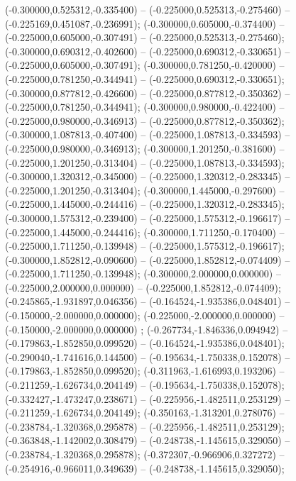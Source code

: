  (-0.300000,0.525312,-0.335400) -- (-0.225000,0.525313,-0.275460) -- (-0.225169,0.451087,-0.236991);
 (-0.300000,0.605000,-0.374400) -- (-0.225000,0.605000,-0.307491) -- (-0.225000,0.525313,-0.275460);
 (-0.300000,0.690312,-0.402600) -- (-0.225000,0.690312,-0.330651) -- (-0.225000,0.605000,-0.307491);
 (-0.300000,0.781250,-0.420000) -- (-0.225000,0.781250,-0.344941) -- (-0.225000,0.690312,-0.330651);
 (-0.300000,0.877812,-0.426600) -- (-0.225000,0.877812,-0.350362) -- (-0.225000,0.781250,-0.344941);
 (-0.300000,0.980000,-0.422400) -- (-0.225000,0.980000,-0.346913) -- (-0.225000,0.877812,-0.350362);
 (-0.300000,1.087813,-0.407400) -- (-0.225000,1.087813,-0.334593) -- (-0.225000,0.980000,-0.346913);
 (-0.300000,1.201250,-0.381600) -- (-0.225000,1.201250,-0.313404) -- (-0.225000,1.087813,-0.334593);
 (-0.300000,1.320312,-0.345000) -- (-0.225000,1.320312,-0.283345) -- (-0.225000,1.201250,-0.313404);
 (-0.300000,1.445000,-0.297600) -- (-0.225000,1.445000,-0.244416) -- (-0.225000,1.320312,-0.283345);
 (-0.300000,1.575312,-0.239400) -- (-0.225000,1.575312,-0.196617) -- (-0.225000,1.445000,-0.244416);
 (-0.300000,1.711250,-0.170400) -- (-0.225000,1.711250,-0.139948) -- (-0.225000,1.575312,-0.196617);
 (-0.300000,1.852812,-0.090600) -- (-0.225000,1.852812,-0.074409) -- (-0.225000,1.711250,-0.139948);
 (-0.300000,2.000000,0.000000) -- (-0.225000,2.000000,0.000000) -- (-0.225000,1.852812,-0.074409);
 (-0.245865,-1.931897,0.046356) -- (-0.164524,-1.935386,0.048401) -- (-0.150000,-2.000000,0.000000);
 (-0.225000,-2.000000,0.000000) -- (-0.150000,-2.000000,0.000000) ;
 (-0.267734,-1.846336,0.094942) -- (-0.179863,-1.852850,0.099520) -- (-0.164524,-1.935386,0.048401);
 (-0.290040,-1.741616,0.144500) -- (-0.195634,-1.750338,0.152078) -- (-0.179863,-1.852850,0.099520);
 (-0.311963,-1.616993,0.193206) -- (-0.211259,-1.626734,0.204149) -- (-0.195634,-1.750338,0.152078);
 (-0.332427,-1.473247,0.238671) -- (-0.225956,-1.482511,0.253129) -- (-0.211259,-1.626734,0.204149);
 (-0.350163,-1.313201,0.278076) -- (-0.238784,-1.320368,0.295878) -- (-0.225956,-1.482511,0.253129);
 (-0.363848,-1.142002,0.308479) -- (-0.248738,-1.145615,0.329050) -- (-0.238784,-1.320368,0.295878);
 (-0.372307,-0.966906,0.327272) -- (-0.254916,-0.966011,0.349639) -- (-0.248738,-1.145615,0.329050);
